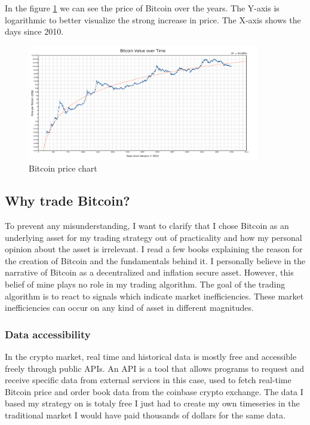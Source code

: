 \documentclass[12pt]{article}
\begin{document}
In the figure \ref{fig:bitcoin_chart} we can see the price of Bitcoin over the years. The Y-axis is logarithmic to better visualize the strong increase in price. The X-axis shows the days since 2010.
\begin{figure}
    \centering
    \includegraphics[width=0.9\textwidth]{imgs/bitcoin_price_over_years.png}
    \caption{Bitcoin price chart}
    \label{fig:bitcoin_chart}
\end{figure}



\newpage

\subsection*{Why trade Bitcoin?}
To prevent any misunderstanding, I want to clarify that I chose Bitcoin as an underlying asset for my trading strategy out of practicality and how my personal opinion about the asset is irrelevant. I read a few books explaining the reason for the creation of Bitcoin and the fundamentals behind it. I personally believe in the narrative of Bitcoin as a decentralized and inflation secure asset. However, this belief of mine plays no role in my trading algorithm. The goal of the trading algorithm is to react to signals which indicate market inefficiencies. These market inefficiencies can occur on any kind of asset in different magnitudes.
\subsubsection*{Data accessibility}
In the crypto market, real time and historical data is mostly free and accessible freely through public APIs. An API is a tool that allows programs to request and receive specific data from external services in this case, used to fetch real-time Bitcoin price and order book data from the coinbase crypto exchange. The data I based my strategy on is totaly free I just had to create my own timeseries in the traditional market I would have paid thousands of dollars for the same data.
\end{document}
